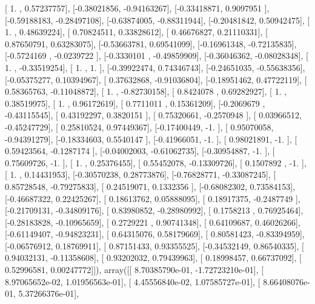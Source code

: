 \documentclass{article}
\begin{document}
       [ 1.        ,  0.57237757],
       [-0.38021856, -0.94163267],
       [-0.33418871,  0.9097951 ],
       [-0.59188183, -0.28497108],
       [-0.63874005, -0.88311944],
       [-0.20481842,  0.50942475],
       [ 1.        ,  0.48639224],
       [ 0.70824511,  0.33828612],
       [ 0.46676827,  0.21110331],
       [ 0.87650791,  0.63283075],
       [-0.53663781,  0.69541099],
       [-0.16961348, -0.72135835],
       [-0.5724169 , -0.0239722 ],
       [-0.3330101 , -0.49859909],
       [-0.36046362, -0.08028348],
       [ 1.        , -0.33519254],
       [ 1.        ,  1.        ],
       [-0.39922474,  0.74346743],
       [-0.24651035, -0.55638356],
       [-0.05375277,  0.10394967],
       [ 0.37632868, -0.91036804],
       [-0.18951462,  0.47722119],
       [ 0.58365763, -0.11048872],
       [ 1.        , -0.82730158],
       [ 0.8424078 ,  0.69282927],
       [ 1.        ,  0.38519975],
       [ 1.        ,  0.96172619],
       [ 0.7711011 ,  0.15361209],
       [-0.2069679 , -0.43115545],
       [ 0.43192297,  0.3820151 ],
       [ 0.75320661, -0.2570948 ],
       [ 0.03966512, -0.45247729],
       [ 0.25810524,  0.97449367],
       [-0.17400449, -1.        ],
       [ 0.95070058, -0.94391279],
       [-0.18334603,  0.5540147 ],
       [-0.41966051, -1.        ],
       [ 0.98021891, -1.        ],
       [ 0.59423564, -0.1287174 ],
       [-0.04002003, -0.61062735],
       [-0.30954887, -1.        ],
       [ 0.75609726, -1.        ],
       [ 1.        ,  0.25376455],
       [ 0.55452078, -0.13309726],
       [ 0.1507892 , -1.        ],
       [ 1.        ,  0.14431953],
       [-0.30570238,  0.28773876],
       [-0.76828771, -0.33087245],
       [ 0.85728548, -0.79275833],
       [ 0.24519071,  0.1332356 ],
       [-0.68082302,  0.73584153],
       [-0.46687322,  0.22425267],
       [ 0.18613762,  0.05888095],
       [ 0.18917375, -0.2487749 ],
       [-0.21709131, -0.34809176],
       [ 0.83980852, -0.28980992],
       [ 0.1758213 ,  0.76925464],
       [-0.28183828, -0.10965659],
       [ 0.2729221 ,  0.90741348],
       [ 0.64109687,  0.46026266],
       [-0.61149407, -0.94823231],
       [ 0.64315076,  0.58179669],
       [ 0.80581423, -0.83394959],
       [-0.06576912,  0.18769911],
       [ 0.87151433,  0.93355525],
       [-0.34532149,  0.86540335],
       [ 0.94032131, -0.11358608],
       [ 0.93202032,  0.79439963],
       [ 0.18998457,  0.66737092],
       [ 0.52996581,  0.00247772]]), array([[  8.70385790e-01,  -1.72723210e-01],
       [  8.97065652e-02,   1.01956563e-01],
       [  4.45556840e-02,   1.07585727e-01],
       [  8.66408076e-01,   5.37266376e-01],
\end{document}
